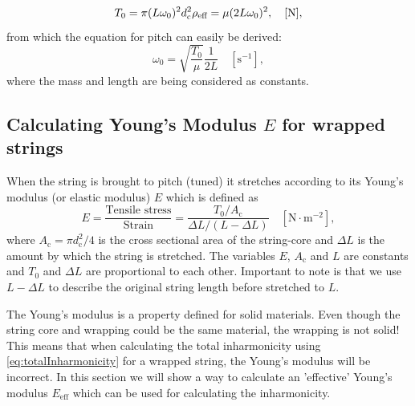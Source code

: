 \documentclass{article}
\begin{document}
\begin{sloppy}
\begin{equation}\label{eq:tension}
    T_0 = \pi (L\omega_0)^2d_\text{c}^2\rho_{\textup{eff}} = \mu(2L\omega_0)^2, \quad [\text{N}],
\end{equation}
from which the equation for pitch can easily be derived:
\begin{equation}
    \omega_0 = \sqrt{\frac{T_0}{\mu}} \frac{1}{2L} \quad [\text{s}^{-1}],
\end{equation}
where the mass and length are being considered as constants. 
%
%
%
%
\subsection{Calculating Young's Modulus $E$ for wrapped strings}%
%
When the string is brought to pitch (tuned) it stretches according to its Young's modulus (or elastic modulus) $E$ which is defined as
%
\begin{equation}\label{eq:tensile_stress}
    E = \frac{\text{Tensile stress}}{\text{Strain}}
    = \frac{T_0/A_\text{c}}{\Delta L/(L - \Delta L)} \quad [\text{N}\cdot\text{m}^{-2}], 
\end{equation}
%
where $A_\text{c} = \pi d_\text{c}^2/4$ is the cross sectional area of the string-core and $\Delta L$ is the amount by which the string is stretched. The variables $E$, $A_\text{c}$ and $L$ are constants and $T_0$ and $\Delta L$ are proportional to each other. Important to note is that we use $L - \Delta L$ to describe the original string length before stretched to $L$.

The Young's modulus is a property defined for solid materials. Even though the string core and wrapping could be the same material, the wrapping is not solid! This means that when calculating the total inharmonicity using \eqref{eq:totalInharmonicity} for a wrapped string, the Young's modulus will be incorrect. In this section we will show a way to calculate an 'effective' Young's modulus $E_\text{eff}$ which can be used for calculating the inharmonicity. 


\end{sloppy}
\end{document}
